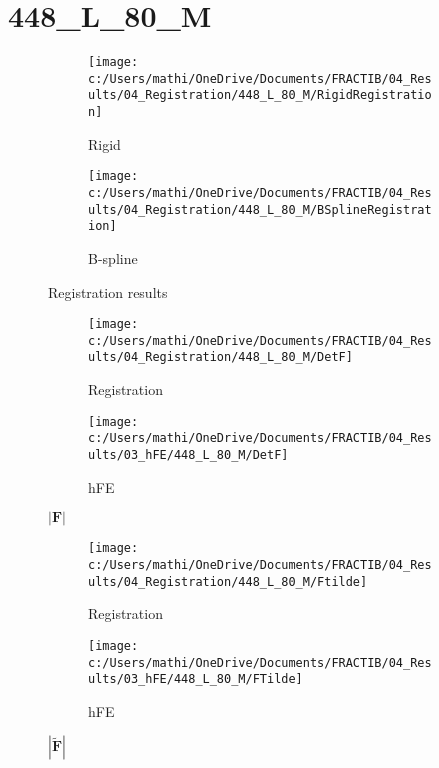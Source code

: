 \documentclass{article}%
\begin{document}
%
\newpage%
\section*{448\_L\_80\_M}%
\label{sec:448L80M}%


\begin{figure}[h!]%
\begin{subfigure}[b]{0.5\linewidth}%
\texttt{[image: c:/Users/mathi/OneDrive/Documents/FRACTIB/04\_Results/04\_Registration/448\_L\_80\_M/RigidRegistration]}%
\caption{Rigid}%
\end{subfigure}%
\begin{subfigure}[b]{0.5\linewidth}%
\texttt{[image: c:/Users/mathi/OneDrive/Documents/FRACTIB/04\_Results/04\_Registration/448\_L\_80\_M/BSplineRegistration]}%
\caption{B{-}spline}%
\end{subfigure}%
\caption{Registration results}%
\end{figure}

%


\begin{figure}[h!]%
\begin{subfigure}[b]{0.5\linewidth}%
\texttt{[image: c:/Users/mathi/OneDrive/Documents/FRACTIB/04\_Results/04\_Registration/448\_L\_80\_M/DetF]}%
\caption{Registration}%
\end{subfigure}%
\begin{subfigure}[b]{0.5\linewidth}%
\texttt{[image: c:/Users/mathi/OneDrive/Documents/FRACTIB/04\_Results/03\_hFE/448\_L\_80\_M/DetF]}%
\caption{hFE}%
\end{subfigure}%
\caption{$|\mathbf{F}|$}%
\end{figure}

%


\begin{figure}[h!]%
\begin{subfigure}[b]{0.5\linewidth}%
\texttt{[image: c:/Users/mathi/OneDrive/Documents/FRACTIB/04\_Results/04\_Registration/448\_L\_80\_M/Ftilde]}%
\caption{Registration}%
\end{subfigure}%
\begin{subfigure}[b]{0.5\linewidth}%
\texttt{[image: c:/Users/mathi/OneDrive/Documents/FRACTIB/04\_Results/03\_hFE/448\_L\_80\_M/FTilde]}%
\caption{hFE}%
\end{subfigure}%
\caption{$|\widetilde{\mathbf{F}}|$}%
\end{figure}

%
\newpage%
\end{document}
